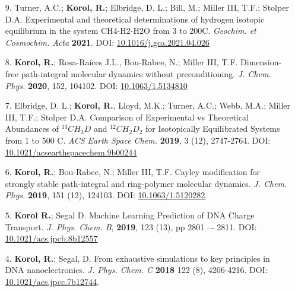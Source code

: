\documentclass[11pt]{res}
\begin{document}
\begin{resume}


\begin{enumerate}
	\item[9.] Turner, A.C.; \textbf{Korol, R.}; Elbridge, D. L.; Bill, M.; Miller III, T.F.; Stolper D.A.
Experimental and theoretical determinations of hydrogen isotopic equilibrium in the system CH4-H2-H2O from 3 to 200\degree C. \textit{Geochim. et Cosmochim. Acta} \textbf{2021}. DOI: \href{https://doi.org/10.1016/j.gca.2021.04.026}{10.1016/j.gca.2021.04.026}

	\item[8.] \textbf{Korol, R.}; Rosa-Ra\'ices J.L., Bou-Rabee,  N.; Miller III, T.F. Dimension-free path-integral molecular dynamics without preconditioning. \textit{J. Chem. Phys.} \textbf{2020}, 152, 104102. DOI: \href{https://aip.scitation.org/doi/abs/10.1063/1.5134810}{10.1063/1.5134810}

	\item[7.] Elbridge, D. L.; \textbf{Korol, R.}, Lloyd, M.K.; Turner, A.C.; Webb, M.A.; Miller III, T.F.; Stolper D.A.
Comparison of Experimental vs Theoretical Abundances of $^{13}CH_3D$ and $^{12}CH_2D_2$ for Isotopically Equilibrated Systems from 1 to 500 \degree C. \textit{ACS Earth Space Chem.} \textbf{2019}, 3 (12), 2747-2764. DOI: \href{https://pubs.acs.org/doi/10.1021/acsearthspacechem.9b00244}{10.1021/acsearthspacechem.9b00244}


	\item[6.] \textbf{Korol, R.}; Bou-Rabee,  N.; Miller III, T.F. Cayley modification for strongly stable path-integral and ring-polymer molecular dynamics. \textit{J. Chem. Phys.} \textbf{2019}, 151 (12), 124103. DOI: \href{https://aip.scitation.org/doi/10.1063/1.5120282}{10.1063/1.5120282}

	\item[5.] \textbf{Korol R.}; Segal D. Machine Learning Prediction of DNA Charge Transport. \textit{J. Phys. Chem. B}, \textbf{2019}, 123 (13), pp 2801 –- 2811. DOI: \href{https://pubs.acs.org/doi/full/10.1021/acs.jpcb.8b12557}{10.1021/acs.jpcb.8b12557}
	
	\item[4.] \textbf{Korol, R.}; Segal, D. From exhaustive simulations to key principles in DNA nanoelectronics. \textit{J. Phys. Chem. C} \textbf{2018} 122 (8), 4206-4216. DOI: \href{https://pubs.acs.org/doi/abs/10.1021/acs.jpcc.7b12744}{10.1021/acs.jpcc.7b12744}.


\end{enumerate}
\end{resume}
\end{document}
